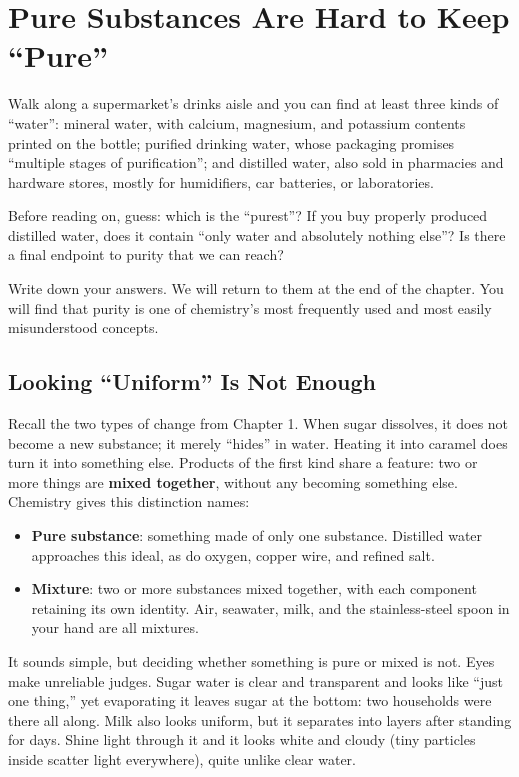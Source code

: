 \chapter{Pure Substances Are Hard to Keep ``Pure''}

\begin{kaichang}
Walk along a supermarket's drinks aisle and you can find at least three kinds of ``water'': mineral water, with calcium, magnesium, and potassium contents printed on the bottle; purified drinking water, whose packaging promises ``multiple stages of purification''; and distilled water, also sold in pharmacies and hardware stores, mostly for humidifiers, car batteries, or laboratories.

Before reading on, guess: which is the ``purest''? If you buy properly produced distilled water, does it contain ``only water and absolutely nothing else''? Is there a final endpoint to purity that we can reach?

Write down your answers. We will return to them at the end of the chapter. You will find that purity is one of chemistry's most frequently used and most easily misunderstood concepts.
\end{kaichang}

\section{Looking ``Uniform'' Is Not Enough}

Recall the two types of change from Chapter 1. When sugar dissolves, it does not become a new substance; it merely ``hides'' in water. Heating it into caramel does turn it into something else. Products of the first kind share a feature: two or more things are \textbf{mixed together}, without any becoming something else. Chemistry gives this distinction names:

\begin{itemize}[itemsep=2pt]
\item \textbf{Pure substance}: something made of only one substance. Distilled water approaches this ideal, as do oxygen, copper wire, and refined salt.
\item \textbf{Mixture}: two or more substances mixed together, with each component retaining its own identity. Air, seawater, milk, and the stainless-steel spoon in your hand are all mixtures.
\end{itemize}

It sounds simple, but deciding whether something is pure or mixed is not. Eyes make unreliable judges. Sugar water is clear and transparent and looks like ``just one thing,'' yet evaporating it leaves sugar at the bottom: two households were there all along. Milk also looks uniform, but it separates into layers after standing for days. Shine light through it and it looks white and cloudy (tiny particles inside scatter light everywhere), quite unlike clear water.


